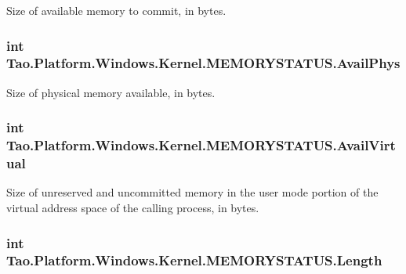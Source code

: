 Size of available memory to commit, in bytes. 

\hypertarget{struct_tao_1_1_platform_1_1_windows_1_1_kernel_1_1_m_e_m_o_r_y_s_t_a_t_u_s_af0f8707357ca1cde94b50e8bdb669311}{
\subsubsection[{AvailPhys}]{\setlength{\rightskip}{0pt plus 5cm}int {\bf Tao.Platform.Windows.Kernel.MEMORYSTATUS.AvailPhys}}}
\label{struct_tao_1_1_platform_1_1_windows_1_1_kernel_1_1_m_e_m_o_r_y_s_t_a_t_u_s_af0f8707357ca1cde94b50e8bdb669311}


Size of physical memory available, in bytes. 

\hypertarget{struct_tao_1_1_platform_1_1_windows_1_1_kernel_1_1_m_e_m_o_r_y_s_t_a_t_u_s_aeee6de3d7ba6bf3719b13d9d0d3eb47d}{
\subsubsection[{AvailVirtual}]{\setlength{\rightskip}{0pt plus 5cm}int {\bf Tao.Platform.Windows.Kernel.MEMORYSTATUS.AvailVirtual}}}
\label{struct_tao_1_1_platform_1_1_windows_1_1_kernel_1_1_m_e_m_o_r_y_s_t_a_t_u_s_aeee6de3d7ba6bf3719b13d9d0d3eb47d}


Size of unreserved and uncommitted memory in the user mode portion of the virtual address space of the calling process, in bytes. 

\hypertarget{struct_tao_1_1_platform_1_1_windows_1_1_kernel_1_1_m_e_m_o_r_y_s_t_a_t_u_s_a3aa617a35bd296e6bfb7315625ca2c2e}{
\subsubsection[{Length}]{\setlength{\rightskip}{0pt plus 5cm}int {\bf Tao.Platform.Windows.Kernel.MEMORYSTATUS.Length}}}
\label{struct_tao_1_1_platform_1_1_windows_1_1_kernel_1_1_m_e_m_o_r_y_s_t_a_t_u_s_a3aa617a35bd296e6bfb7315625ca2c2e}


